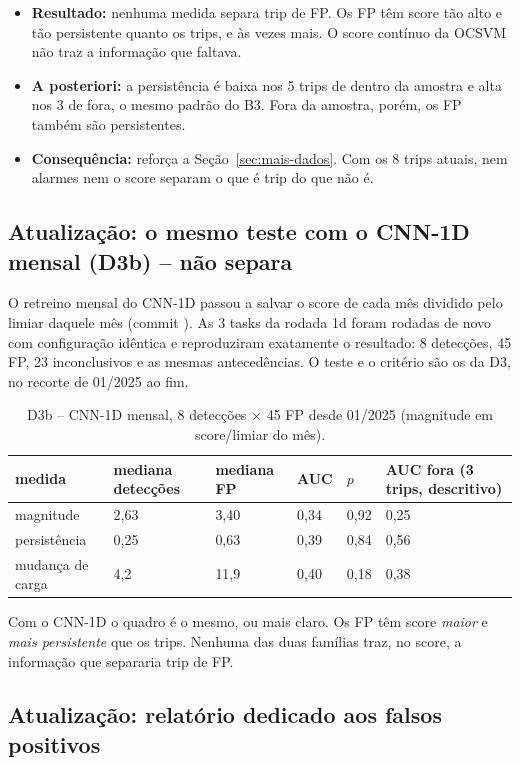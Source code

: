 \documentclass[11pt,a4paper]{article}
\newcommand{\tg}[1]{\texttt{\detokenize{#1}}}
\begin{document}
\begin{itemize}
  \item \textbf{Resultado:} nenhuma medida separa trip de FP. Os FP têm score tão alto e tão persistente quanto os
        trips, e às vezes mais. O score contínuo da OCSVM não traz a informação que faltava.
  \item \textbf{A posteriori:} a persistência é baixa nos 5 trips de dentro da amostra e alta nos 3 de fora, o mesmo
        padrão do B3. Fora da amostra, porém, os FP também são persistentes.
  \item \textbf{Consequência:} reforça a Seção~\ref{sec:mais-dados}. Com os 8 trips atuais, nem alarmes nem o score
        separam o que é trip do que não é.
\end{itemize}

\subsection*{Atualização: o mesmo teste com o CNN-1D mensal (D3b) -- não separa}

O retreino mensal do CNN-1D passou a salvar o score de cada mês dividido pelo limiar daquele mês (commit
\tg{77f09c4}). As 3 tasks da rodada 1d foram rodadas de novo com configuração idêntica e reproduziram exatamente o
resultado: 8 detecções, 45 FP, 23 inconclusivos e as mesmas antecedências. O teste e o critério são os da D3, no
recorte de 01/2025 ao fim.

\begin{table}[H]
\centering\small
\caption{D3b -- CNN-1D mensal, 8 detecções $\times$ 45 FP desde 01/2025 (magnitude em score/limiar do mês).}
\begin{tabular}{llllll}
\toprule
medida & mediana detecções & mediana FP & AUC & $p$ & AUC fora (3 trips, descritivo) \\
\midrule
magnitude & 2,63 & 3,40 & 0,34 & 0,92 & 0,25 \\
persistência & 0,25 & 0,63 & 0,39 & 0,84 & 0,56 \\
mudança de carga & 4,2 & 11,9 & 0,40 & 0,18 & 0,38 \\
\bottomrule
\end{tabular}
\end{table}

Com o CNN-1D o quadro é o mesmo, ou mais claro. Os FP têm score \emph{maior} e \emph{mais persistente} que os trips.
Nenhuma das duas famílias traz, no score, a informação que separaria trip de FP.

\subsection*{Atualização: relatório dedicado aos falsos positivos}
\end{document}
